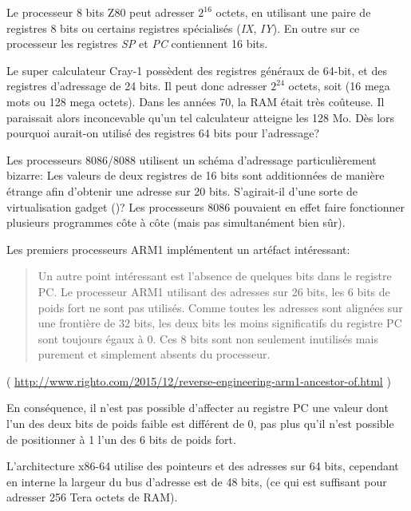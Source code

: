 Le processeur 8 bits Z80 peut adresser $2^{16}$ octets, en utilisant une paire de registres 8 bits ou certains registres
spécialisés (\emph{IX}, \emph{IY}). En outre sur ce processeur les registres \emph{SP} et \emph{PC} contiennent 16 bits.

Le super calculateur Cray-1 possèdent des registres généraux de 64-bit, et des registres d'adressage de 24 bits.
Il peut donc adresser $2^{24}$ octets, soit (16 mega mots ou 128 mega octets).
Dans les années 70, la RAM était très coûteuse. Il paraissait alors inconcevable qu'un tel calculateur atteigne
les 128 Mo. Dès lors pourquoi aurait-on utilisé des registres 64 bits pour l'adressage?

Les processeurs 8086/8088 utilisent un schéma d'adressage particulièrement bizarre:
Les valeurs de deux registres de 16 bits sont additionnées de manière étrange afin d'obtenir une adresse sur 20 bits.
S'agirait-il d'une sorte de virtualisation gadget ()?
Les processeurs 8086 pouvaient en effet faire fonctionner plusieurs programmes côte à côte (mais pas simultanément bien sûr).

Les premiers processeurs ARM1 implémentent un artéfact intéressant:

\begin{framed}
\begin{quotation}
Un autre point intéressant est l'absence de quelques bits dans le registre PC. Le processeur ARM1 utilisant des adresses
sur 26 bits, les 6 bits de poids fort ne sont pas utilisés. Comme toutes les adresses sont alignées sur une frontière de
32 bits, les deux bits les moins significatifs du registre PC sont toujours égaux à 0. Ces 8 bits sont non seulement
inutilisés mais purement et simplement absents du processeur.
\end{quotation}
\end{framed}

( \url{http://www.righto.com/2015/12/reverse-engineering-arm1-ancestor-of.html} )

En conséquence, il n'est pas possible d'affecter au registre PC une valeur dont l'un des deux bits de poids faible est
différent de 0, pas plus qu'il n'est possible de positionner à 1 l'un des 6 bits de poids fort.

L'architecture x86-64 utilise des pointeurs et des adresses sur 64 bits, cependant en interne la largeur du bus
d'adresse est de 48 bits, (ce qui est suffisant pour adresser 256 Tera octets de \ac{RAM}).

